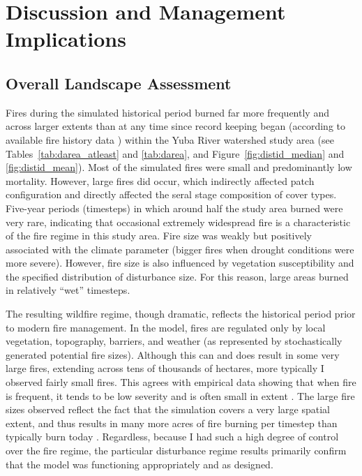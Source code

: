 
\section{Discussion and Management Implications}
\label{sec:hrvdiscussion}






\subsection{Overall Landscape Assessment}

Fires during the simulated historical period burned far more frequently and across larger extents than at any time since record keeping began (according to available fire history data \citep{calfire2012,usgs-fire-data2012}) within the Yuba River watershed study area (see Tables~\ref{tab:darea_atleast} and \ref{tab:darea}, and Figure~\ref{fig:distid_median} and \ref{fig:distid_mean}). Most of the simulated fires were small and predominantly low mortality. However, large fires did occur, which indirectly affected patch configuration and directly affected the seral stage composition of cover types. Five-year periods (timesteps) in which around half the study area burned were very rare, indicating that occasional extremely widespread fire is a characteristic of the fire regime in this study area. Fire size was weakly but positively associated with the climate parameter (bigger fires when drought conditions were more severe). However, fire size is also influenced by vegetation susceptibility and the specified distribution of disturbance size. For this reason, large areas burned in relatively ``wet'' timesteps. 

The resulting wildfire regime, though dramatic, reflects the historical period prior to modern fire management. In the model, fires are regulated only by local vegetation, topography, barriers, and weather (as represented by stochastically generated potential fire sizes). Although this can and does result in some very large fires, extending across tens of thousands of hectares, more typically I observed fairly small fires. This agrees with empirical data showing that when fire is frequent, it tends to be low severity and is often small in extent \citep{Kilgore1979,Taylor2012}. The large fire sizes observed reflect the fact that the simulation covers a very large spatial extent, and thus results in many more acres of fire burning per timestep than typically burn today \citep{calfire2012,usgs-fire-data2012}. Regardless, because I had such a high degree of control over the fire regime, the particular disturbance regime results primarily confirm that the model was functioning appropriately and as designed. 

